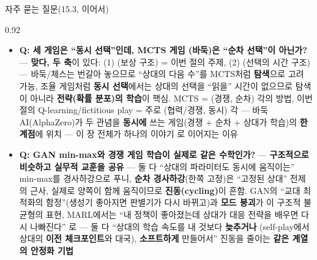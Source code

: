\begin{frame}{자주 묻는 질문(15.3, 이어서)}
\begin{center}\begin{varwidth}{0.92\textwidth}
  \small
  \begin{itemize}
    \item \textbf{Q: 세 게임은 ``동시 선택''인데, MCTS 게임
      (바둑)은 ``순차 선택''이 아닌가?} --- \textbf{맞다,
      두 축}이 있다: (1) (보상 구조) = 이번
      절의 주제, (2) (선택의 시간 구조) ---
      바둑/체스는 번갈아 놓으므로 ``상대의 다음 수''를
      MCTS처럼 \textbf{탐색}으로 고려 가능, 조율 게임처럼
      \textbf{동시 선택}에서는 상대의 선택을 ``읽을''
      시간이 없으므로 탐색이 아니라 \textbf{전략(확률
      분포)의 학습}이 핵심. MCTS = (경쟁, 순차) 각의 방법,
      이번 절의 Q-learning/fictitious play = 주로 (협력/경쟁,
      동시) 각 --- 바둑 AI(AlphaZero)가 두 관념을
      \textbf{동시에} 쓰는 게임(경쟁 + 순차 + 상대가 학습)의
      \textbf{한계점}에 위치 --- 이 장 전체가 하나의 이야기
     로 이어지는 이유
    \item \textbf{Q: GAN min-max와 경쟁 게임 학습이 실제로
      같은 수학인가?} --- \textbf{구조적으로 비슷하고 실무적
      교훈을 공유} --- 둘 다 ``상대의 파라미터도 동시에
      움직이는'' min-max를 경사하강으로 푸니, \textbf{순차
      경사하강}(한쪽 고정)은 ``고정된 상대'' 전제의 근사,
      실제로 양쪽이 함께 움직이므로 \textbf{진동(cycling)}이
      흔함. GAN의 ``교대 최적화의 함정''(생성기 좋아지면
      판별기가 다시 바뀌고)과 \textbf{모드 붕괴}가 이
      구조적 불균형의 표현, MARL에서는 ``내 정책이
      좋아졌는데 상대가 대응 전략을 배우면 다시 나빠진다''
     로 --- 둘 다 ``상대의 학습 속도를 내 것보다 \textbf{늦추거나
      }(self-play에서 상대의 \textbf{이전 체크포인트}와
      대국), \textbf{소프트하게} 만들어서'' 진동을 줄이는
      \textbf{같은 계열의 안정화 기법}
  \end{itemize}
\end{varwidth}\end{center}
\end{frame}
